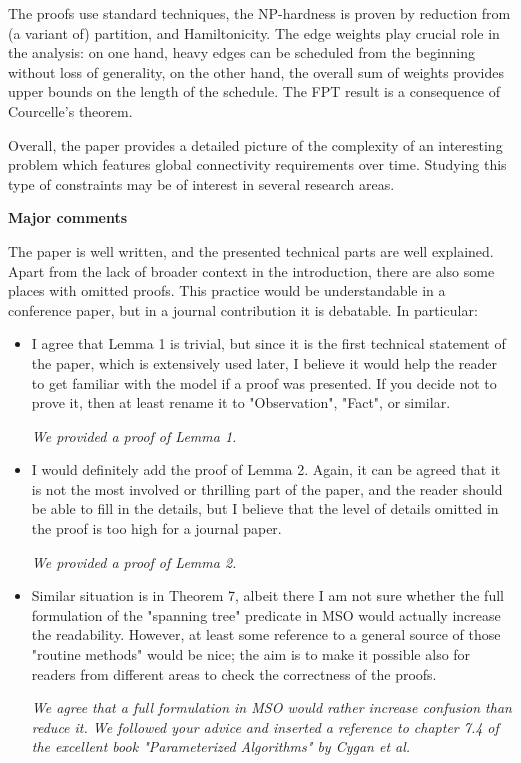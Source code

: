 \documentclass[11pt,a4paper]{article}
\begin{document}
The proofs use standard techniques, the NP-hardness is proven by reduction from
(a variant of) partition, and Hamiltonicity. The edge weights play crucial role
in the analysis: on one hand, heavy edges can be scheduled from the beginning
without loss of generality, on the other hand, the overall sum of weights
provides upper bounds on the length of the schedule.  The FPT result is a
consequence of Courcelle's theorem.

Overall, the paper provides a detailed picture of the complexity of an
interesting problem which features global connectivity requirements over time.
Studying this type of constraints may be of interest in several research
areas.

\textbf{Major comments}

The paper is well written, and the presented technical parts are well
explained.  Apart from the lack of broader context in the introduction, there
are also some places with omitted proofs. This practice would be understandable
in a conference paper, but in a journal contribution it is debatable. In
particular:

\begin{itemize}

\item I agree that Lemma 1 is trivial, but since it is the first technical
  statement of the paper, which is extensively used later, I believe it would
  help the reader to get familiar with the model if a proof was presented. If
  you decide not to prove it, then at least rename it to "Observation", "Fact",
  or similar.

\textit{We provided a proof of Lemma 1.}

\item I would definitely add the proof of Lemma 2. Again, it can be agreed that it
  is not the most involved or thrilling part of the paper, and the reader
  should be able to fill in the details, but I believe that the level of
  details omitted in the proof is too high for a journal paper.

\textit{We provided a proof of Lemma 2.}

\item Similar situation is in Theorem 7, albeit there I am not sure whether the
  full formulation of the "spanning tree" predicate in MSO would actually
  increase the readability. However, at least some reference to a general
  source of those "routine methods" would be nice; the aim is to make it
  possible also for readers from different areas to check the correctness of
  the proofs.
  
\textit{We agree that a full formulation in MSO would rather increase confusion than reduce it. We followed your advice and inserted a reference to chapter 7.4 of the excellent book  "Parameterized Algorithms" by Cygan et al. } 
 
\end{itemize}
\end{document}
